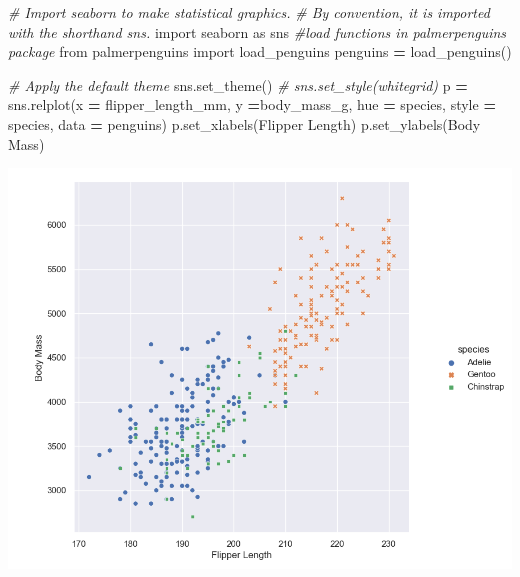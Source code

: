 \documentclass[
]{book}
\newenvironment{Shaded}{\begin{snugshade}}{\end{snugshade}}
\newcommand{\CommentTok}[1]{\textcolor[rgb]{0.56,0.35,0.01}{\textit{#1}}}
\newcommand{\ImportTok}[1]{#1}
\newcommand{\NormalTok}[1]{#1}
\newcommand{\OperatorTok}[1]{\textcolor[rgb]{0.81,0.36,0.00}{\textbf{#1}}}
\newcommand{\StringTok}[1]{\textcolor[rgb]{0.31,0.60,0.02}{#1}}
\begin{document}
\begin{Shaded}
\begin{Highlighting}[]
\CommentTok{\# Import seaborn to make statistical graphics. }
\CommentTok{\# By convention, it is imported with the shorthand sns.}
\ImportTok{import}\NormalTok{ seaborn }\ImportTok{as}\NormalTok{ sns }
\CommentTok{\#load functions in palmerpenguins package}
\ImportTok{from}\NormalTok{ palmerpenguins }\ImportTok{import}\NormalTok{ load\_penguins}
\NormalTok{penguins }\OperatorTok{=}\NormalTok{ load\_penguins()}

\CommentTok{\# Apply the default theme}
\NormalTok{sns.set\_theme()}
\CommentTok{\# sns.set\_style(\textquotesingle{}whitegrid\textquotesingle{})}
\NormalTok{p }\OperatorTok{=}\NormalTok{ sns.relplot(x }\OperatorTok{=} \StringTok{\textquotesingle{}flipper\_length\_mm\textquotesingle{}}\NormalTok{,}
\NormalTok{            y }\OperatorTok{=}\StringTok{\textquotesingle{}body\_mass\_g\textquotesingle{}}\NormalTok{,}
\NormalTok{            hue }\OperatorTok{=} \StringTok{\textquotesingle{}species\textquotesingle{}}\NormalTok{,}
\NormalTok{            style }\OperatorTok{=} \StringTok{\textquotesingle{}species\textquotesingle{}}\NormalTok{,}
\NormalTok{            data }\OperatorTok{=}\NormalTok{ penguins)}
\NormalTok{p.set\_xlabels(}\StringTok{\textquotesingle{}Flipper Length\textquotesingle{}}\NormalTok{)}
\NormalTok{p.set\_ylabels(}\StringTok{\textquotesingle{}Body Mass\textquotesingle{}}\NormalTok{)   }
\end{Highlighting}
\end{Shaded}

\begin{center}\includegraphics[width=0.9\linewidth]{fig/Viz_chap/2_seaborn} \end{center}
\end{document}
